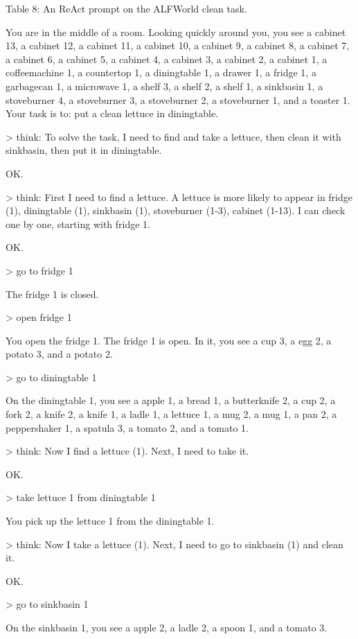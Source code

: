 \documentclass[
]{article}
\begin{document}
Table 8: An ReAct prompt on the ALFWorld clean task.

You are in the middle of a room. Looking quickly around you, you see a
cabinet 13, a cabinet 12, a cabinet 11, a cabinet 10, a cabinet 9, a
cabinet 8, a cabinet 7, a cabinet 6, a cabinet 5, a cabinet 4, a cabinet
3, a cabinet 2, a cabinet 1, a coffeemachine 1, a countertop 1, a
diningtable 1, a drawer 1, a fridge 1, a garbagecan 1, a microwave 1, a
shelf 3, a shelf 2, a shelf 1, a sinkbasin 1, a stoveburner 4, a
stoveburner 3, a stoveburner 2, a stoveburner 1, and a toaster 1. Your
task is to: put a clean lettuce in diningtable.

\textgreater{} think: To solve the task, I need to find and take a
lettuce, then clean it with sinkbasin, then put it in diningtable.

OK.

\textgreater{} think: First I need to find a lettuce. A lettuce is more
likely to appear in fridge (1), diningtable (1), sinkbasin (1),
stoveburner (1-3), cabinet (1-13). I can check one by one, starting with
fridge 1.

OK.

\textgreater{} go to fridge 1

The fridge 1 is closed.

\textgreater{} open fridge 1

You open the fridge 1. The fridge 1 is open. In it, you see a cup 3, a
egg 2, a potato 3, and a potato 2.

\textgreater{} go to diningtable 1

On the diningtable 1, you see a apple 1, a bread 1, a butterknife 2, a
cup 2, a fork 2, a knife 2, a knife 1, a ladle 1, a lettuce 1, a mug 2,
a mug 1, a pan 2, a peppershaker 1, a spatula 3, a tomato 2, and a
tomato 1.

\textgreater{} think: Now I find a lettuce (1). Next, I need to take it.

OK.

\textgreater{} take lettuce 1 from diningtable 1

You pick up the lettuce 1 from the diningtable 1.

\textgreater{} think: Now I take a lettuce (1). Next, I need to go to
sinkbasin (1) and clean it.

OK.

\textgreater{} go to sinkbasin 1

On the sinkbasin 1, you see a apple 2, a ladle 2, a spoon 1, and a
tomato 3.
\end{document}

